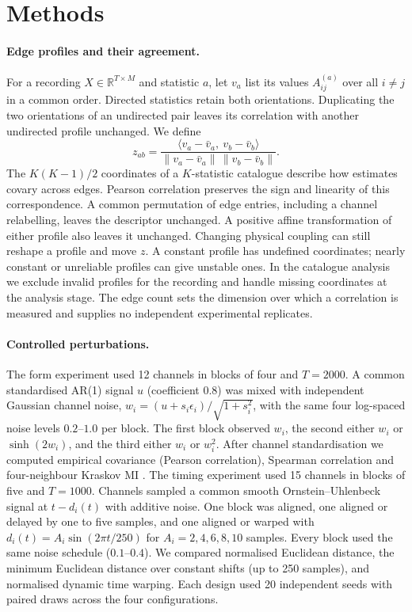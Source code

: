 \section{Methods}
\label{sec:methods}

\paragraph{Edge profiles and their agreement.}
For a recording $X\in\mathbb{R}^{T\times M}$ and statistic $a$, let $v_a$ list its values $A^{(a)}_{ij}$ over all $i\ne j$ in a common order. Directed statistics retain both orientations. Duplicating the two orientations of an undirected pair leaves its correlation with another undirected profile unchanged. We define
\begin{equation}
z_{ab}=\frac{\langle v_a-\bar v_a,\ v_b-\bar v_b\rangle}{\|v_a-\bar v_a\|\,\|v_b-\bar v_b\|}.
\label{eq:z}
\end{equation}
The $K(K-1)/2$ coordinates of a $K$-statistic catalogue describe how estimates covary across edges. Pearson correlation preserves the sign and linearity of this correspondence. A common permutation of edge entries, including a channel relabelling, leaves the descriptor unchanged. A positive affine transformation of either profile also leaves it unchanged. Changing physical coupling can still reshape a profile and move $z$. A constant profile has undefined coordinates; nearly constant or unreliable profiles can give unstable ones. In the catalogue analysis we exclude invalid profiles for the recording and handle missing coordinates at the analysis stage. The edge count sets the dimension over which a correlation is measured and supplies no independent experimental replicates.

\paragraph{Controlled perturbations.}
The form experiment used 12 channels in blocks of four and $T=2000$. A common standardised AR(1) signal $u$ (coefficient $0.8$) was mixed with independent Gaussian channel noise, $w_i=(u+s_i\epsilon_i)/\sqrt{1+s_i^2}$, with the same four log-spaced noise levels $0.2$--$1.0$ per block. The first block observed $w_i$, the second either $w_i$ or $\sinh(2w_i)$, and the third either $w_i$ or $w_i^2$. After channel standardisation we computed empirical covariance (Pearson correlation), Spearman correlation and four-neighbour Kraskov MI \cite{kraskov2004}. The timing experiment used 15 channels in blocks of five and $T=1000$. Channels sampled a common smooth Ornstein--Uhlenbeck signal at $t-d_i(t)$ with additive noise. One block was aligned, one aligned or delayed by one to five samples, and one aligned or warped with $d_i(t)=A_i\sin(2\pi t/250)$ for $A_i=2,4,6,8,10$ samples. Every block used the same noise schedule ($0.1$--$0.4$). We compared normalised Euclidean distance, the minimum Euclidean distance over constant shifts (up to 250 samples), and normalised dynamic time warping. Each design used 20 independent seeds with paired draws across the four configurations.

